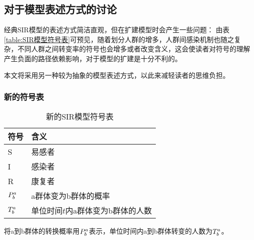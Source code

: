 \subsection{对于模型表述方式的讨论}
\par 经典SIR模型的表述方式简洁直观，但在扩建模型时会产生一些问题：
由表\ref{table:SIR模型符号表}可预见，随着划分人群的增多，人群间感染机制也随之复杂，不同人群之间转变率的符号也会增多或者改变含义，这会使读者对符号的理解产生负面的路径依赖影响，对于模型的扩建是十分不利的。
\par 本文将采用另一种较为抽象的模型表述方式，以此来减轻读者的思维负担。
\subsubsection{新的符号表}
\begin{table}[H]
	\centering
	\caption{新的SIR模型符号表}
	\begin{tabular}{ll}
		\hline
		符号       & 含义                              \\
		\hline
		S          & 易感者                            \\
		I          & 感染者                            \\
		R          & 康复者                            \\
		$\P{a}{b}$ & a群体变为b群体的概率              \\
		$\T{a}{b}$ & 单位时间$t$内a群体变为b群体的人数 \\
		\hline
	\end{tabular}
\end{table}
\par 将a到b群体的转换概率用$\P{a}{b}$表示，单位时间内a到b群体转变的人数为$\T{a}{b}$。
